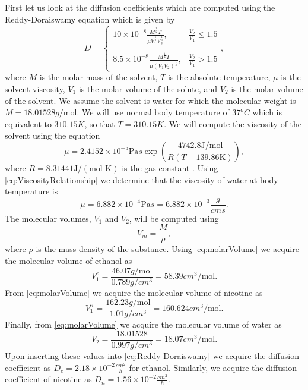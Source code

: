 \documentclass[\main/thesis.tex]{subfiles}
\begin{document}
First let us look at the diffusion coefficients which are computed using the Reddy-Doraiswamy equation \cite{Reddy} which is given by
\begin{equation}
D {=} 
\begin{cases}
  10 {\times} 10^{-8} \frac{M^{\frac{1}{2}} T}{\mu V_1^{\frac{1}{3}} V_2^{\frac{1}{3}}}, & \frac{V_2}{V_1} {\le} 1.5 \\ \\
  8.5 {\times} 10^{-8} \frac{M^{\frac{1}{2}} T}{\mu (V_1 V_2)^{\frac{1}{3}}}, & \frac{V_2}{V_1} > 1.5
\end{cases},
\label{eq:Reddy-Doraiswamy}
\end{equation}
where $M$ is the molar mass of the solvent, $T$ is the absolute temperature, $\mu$ is the solvent viscosity, $V_1$ is the molar volume of the solute, and $V_2$ is the molar volume of the solvent. We assume the solvent is water for which the molecular weight is $M {=} 18.01528 g/\text{mol}$. We will use normal body temperature of $37^o C$ which is equivalent to $310.15 K$, so that $T {=} 310.15 K$. We will compute the viscosity of the solvent using the equation
\begin{equation}
\mu {=} 2.4152{\times}10^{-5} \text{Pa} s \exp\left(\frac{4742.8 \text{J}/\text{mol}}{R(T-139.86 \text{K})}\right),
\label{eq:ViscosityRelationship}
\end{equation}
where $R {=} 8.31441 \text{J}/(\text{mol K})$ is the gas constant \cite{FogelSon}.
Using \eqref{eq:ViscosityRelationship} we determine that the viscosity of water at body temperature is
$$\mu {=} 6.882 {\times} 10^{-4} \text{Pa} s {=} 6.882 {\times} 10^{-3} \frac{g}{cm s}.$$ 
The molecular volumes, $V_1$ and $V_2$, will be computed using
\begin{equation}
    V_m {=} \frac{M}{\rho},
    \label{eq:molarVolume}
\end{equation}
where $\rho$ is the mass density of the substance. 
Using \eqref{eq:molarVolume} we acquire the molecular volume of ethanol as
$$V_1^e {=}  \frac{46.07 g/\text{mol}}{0.789 g/cm^3} {=} 58.39 cm^3/\text{mol}.$$
From \eqref{eq:molarVolume} we acquire the molecular volume of nicotine as
$$V_1^n {=} \frac{162.23 g/\text{mol}}{1.01 g/cm^3} {=} 160.624 cm^3/\text{mol}.$$
Finally, from \eqref{eq:molarVolume} we acquire the molecular volume of water as
$$V_2 {=} \frac{18.01528}{0.997 g/cm^3} {=} 18.07 cm^3/\text{mol}.$$
Upon inserting these values into \eqref{eq:Reddy-Doraiswamy} we acquire the diffusion coefficient as $D_e {=} 2.18{\times}10^{-2} \frac{cm^2}{h}$ for ethanol. Similarly, we acquire the diffusion coefficient of nicotine as $D_n {=} 1.56{\times}10^{-2} \frac{cm^2}{h}$.
\end{document}
